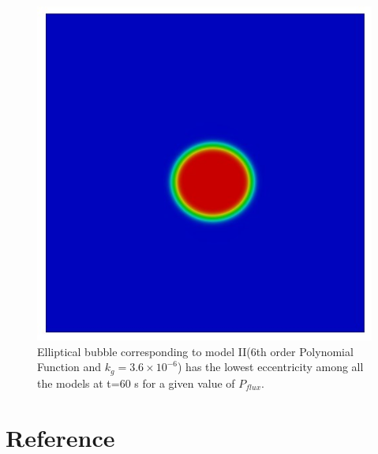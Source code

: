 \documentclass[10pt,a4paper]{article}
\begin{document}
\begin{figure}
\caption{Elliptical bubble corresponding to model II(6th order Polynomial Function and $k_g = 3.6 \times 10 ^{-6}$) has the lowest eccentricity among all the models at t=60 s for a given value of $P_{flux}$.}
\centering
	\includegraphics[scale=0.5]{poly6iw5t60}
\end{figure}








\section*{Reference}
\end{document}
